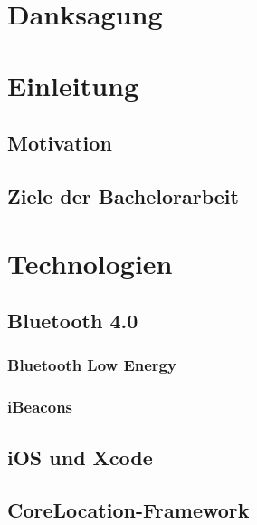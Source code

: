 \documentclass[liststotoc,a4paper, 12pt]{scrartcl}
\begin{document}
\newpage



\tableofcontents


\newpage

\listoffigures
\newpage

\listoftables
\newpage

\lstlistoflistings
\newpage

\setcounter{page}{1}
\setcounter{secnumdepth}{2}


\section{Danksagung}

\section{Einleitung}
\subsection{Motivation}
\subsection{Ziele der Bachelorarbeit}

\section{Technologien}

\subsection{Bluetooth 4.0}
\subsubsection{Bluetooth Low Energy}
\subsubsection{iBeacons}

\subsection{iOS und Xcode}

\subsection{CoreLocation-Framework}
\end{document}
